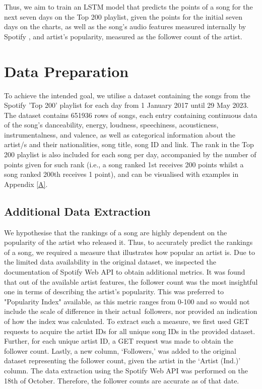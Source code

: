 \documentclass{article}
\begin{document}
Thus, we aim to train an LSTM model that predicts the points of a song for the next seven days on the Top 200 playlist, given the points for the initial seven days on the charts, as well as the song's audio features measured internally by Spotify \cite{spotifySpotifyDevelopers}, and artist's popularity, measured as the follower count of the artist.

\section{Data Preparation}
To achieve the intended goal, we utilise a dataset containing the songs from the Spotify ’Top 200’ playlist for each day from 1 January 2017 until 29 May 2023. The dataset contains 651936 rows of songs, each entry containing continuous data of the song’s danceability, energy, loudness, speechiness, acousticness, instrumentalness, and valence, as well as categorical information about the artist/s and their nationalities, song title, song ID and link. The rank in the Top 200 playlist is also included for each song per day, accompanied by the number of points given for such rank (i.e., a song ranked 1st receives 200 points whilst a song ranked 200th receives 1 point), and can be visualised with examples in Appendix \ref{A}.

\subsection{Additional Data Extraction}
We hypothesise that the rankings of a song are highly dependent on the popularity of the artist who released it. Thus, to accurately predict the rankings of a song, we required a measure that illustrates how popular an artist is. Due to the limited data availability in the original dataset, we inspected the documentation of Spotify Web API \cite{spotifySpotifyDevelopers} to obtain additional metrics. It was found that out of the available artist features, the follower count was the most insightful one in terms of describing the artist’s popularity. This was preferred to "Popularity Index" available, as this metric ranges from  0-100 and so would not include the scale of difference in their actual followers, nor provided an indication of how the index was calculated.
To extract such a measure, we first used GET requests to acquire the artist IDs for all unique song IDs in the provided dataset. Further, for each unique artist ID, a GET request was made to obtain the follower count. Lastly, a new column, ‘Followers,’ was added to the original dataset representing the follower count, given the artist in the ‘Artist (Ind.)’ column. The data extraction using the Spotify Web API was performed on the 18th of October. Therefore, the follower counts are accurate as of that date.
\end{document}
